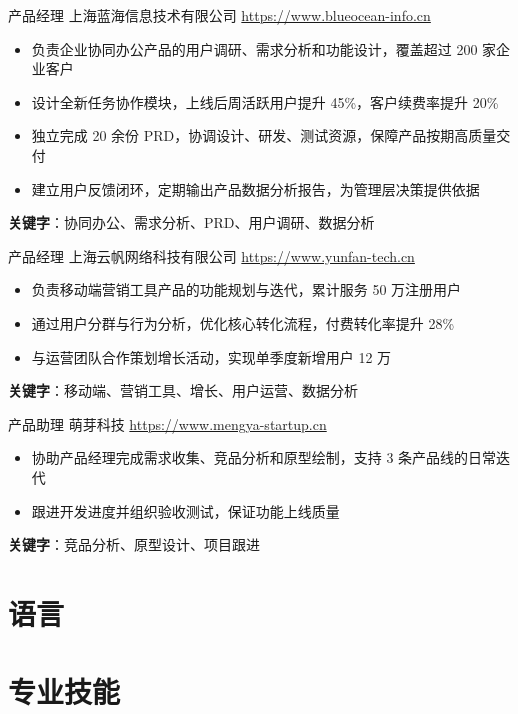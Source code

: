 \documentclass[a4paper, serif, 10pt]{moderncv}
\begin{document}
        {产品经理}
        {上海蓝海信息技术有限公司}
        {\url{https://www.blueocean-info.cn}}
        {}
        {\begin{itemize}
\item 负责企业协同办公产品的用户调研、需求分析和功能设计，覆盖超过 200 家企业客户
\item 设计全新任务协作模块，上线后周活跃用户提升 45\%，客户续费率提升 20\%
\item 独立完成 20 余份 PRD，协调设计、研发、测试资源，保障产品按期高质量交付
\item 建立用户反馈闭环，定期输出产品数据分析报告，为管理层决策提供依据
\end{itemize}
\textbf{关键字}：协同办公、需求分析、PRD、用户调研、数据分析}

        {产品经理}
        {上海云帆网络科技有限公司}
        {\url{https://www.yunfan-tech.cn}}
        {}
        {\begin{itemize}
\item 负责移动端营销工具产品的功能规划与迭代，累计服务 50 万注册用户
\item 通过用户分群与行为分析，优化核心转化流程，付费转化率提升 28\%
\item 与运营团队合作策划增长活动，实现单季度新增用户 12 万
\end{itemize}
\textbf{关键字}：移动端、营销工具、增长、用户运营、数据分析}

        {产品助理}
        {萌芽科技}
        {\url{https://www.mengya-startup.cn}}
        {}
        {\begin{itemize}
\item 协助产品经理完成需求收集、竞品分析和原型绘制，支持 3 条产品线的日常迭代
\item 跟进开发进度并组织验收测试，保证功能上线质量
\end{itemize}
\textbf{关键字}：竞品分析、原型设计、项目跟进}
\section{语言}

\section{专业技能}

\end{document}
